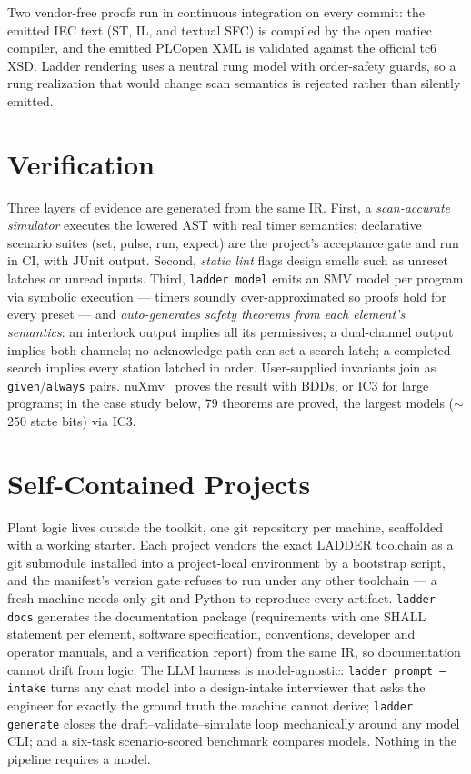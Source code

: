\documentclass[letterpaper]{jacow}
\begin{document}
Two vendor-free proofs run in continuous integration on every commit:
the emitted IEC text (ST, IL, and textual SFC) is compiled by the open
matiec compiler, and the emitted PLCopen XML is validated against the
official tc6 XSD. Ladder rendering uses a neutral rung model with
order-safety guards, so a rung realization that would change scan
semantics is rejected rather than silently emitted.

\section{Verification}

Three layers of evidence are generated from the same IR. First, a
\emph{scan-accurate simulator} executes the lowered AST with real
timer semantics; declarative scenario suites (set, pulse, run,
expect) are the project's acceptance gate and run in CI, with JUnit
output. Second, \emph{static lint} flags design smells such as
unreset latches or unread inputs. Third, \texttt{ladder model} emits
an SMV model per program via symbolic execution --- timers soundly
over-approximated so proofs hold for every preset --- and
\emph{auto-generates safety theorems from each element's semantics}:
an interlock output implies all its permissives; a dual-channel
output implies both channels; no acknowledge path can set a search
latch; a completed search implies every station latched in order.
User-supplied invariants join as
\texttt{given}/\texttt{always} pairs. nuXmv~\cite{nuxmv} proves the
result with BDDs, or IC3 for large programs; in the case study below,
79 theorems are proved, the largest models ($\sim$250 state bits)
via IC3.

\section{Self-Contained Projects}

Plant logic lives outside the toolkit, one git repository per machine,
scaffolded with a working starter. Each project vendors the exact
LADDER toolchain as a git submodule installed into a project-local
environment by a bootstrap script, and the manifest's version gate
refuses to run under any other toolchain --- a fresh machine needs
only git and Python to reproduce every artifact. \texttt{ladder docs}
generates the documentation package (requirements with one SHALL
statement per element, software specification, conventions, developer
and operator manuals, and a verification report) from the same IR, so
documentation cannot drift from logic. The LLM harness is
model-agnostic: \texttt{ladder prompt --intake} turns any chat model
into a design-intake interviewer that asks the engineer for exactly
the ground truth the machine cannot derive; \texttt{ladder generate}
closes the draft--validate--simulate loop mechanically around any
model CLI; and a six-task scenario-scored benchmark compares models.
Nothing in the pipeline requires a model.
\end{document}
